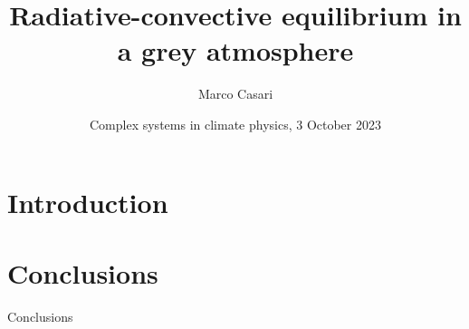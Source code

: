 \documentclass[aspectratio=43]{beamer}
\title{Radiative-convective equilibrium in a grey atmosphere}
\author{Marco Casari}
\date[03/10/2023]{Complex systems in climate physics, 3 October 2023}
\institute[UniTo]{University of Turin}
\begin{document}
\begin{frame}
  \titlepage
\end{frame}

\section{Introduction}

\section{Conclusions}
\begin{frame}{Conclusions}
\end{frame}
\end{document}
